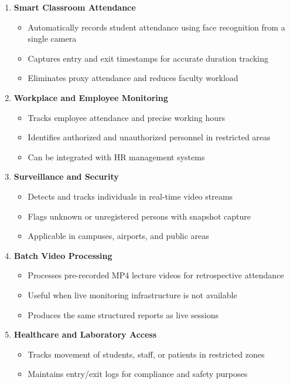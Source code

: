 \documentclass{report}
\begin{document}
\begin{enumerate}

\item \textbf{Smart Classroom Attendance}
\begin{itemize}
    \item Automatically records student attendance using face recognition from a single camera
    \item Captures entry and exit timestamps for accurate duration tracking
    \item Eliminates proxy attendance and reduces faculty workload
\end{itemize}

\item \textbf{Workplace and Employee Monitoring}
\begin{itemize}
    \item Tracks employee attendance and precise working hours
    \item Identifies authorized and unauthorized personnel in restricted areas
    \item Can be integrated with HR management systems
\end{itemize}

\item \textbf{Surveillance and Security}
\begin{itemize}
    \item Detects and tracks individuals in real-time video streams
    \item Flags unknown or unregistered persons with snapshot capture
    \item Applicable in campuses, airports, and public areas
\end{itemize}

\item \textbf{Batch Video Processing}
\begin{itemize}
    \item Processes pre-recorded MP4 lecture videos for retrospective attendance
    \item Useful when live monitoring infrastructure is not available
    \item Produces the same structured reports as live sessions
\end{itemize}

\item \textbf{Healthcare and Laboratory Access}
\begin{itemize}
    \item Tracks movement of students, staff, or patients in restricted zones
    \item Maintains entry/exit logs for compliance and safety purposes
\end{itemize}


\end{enumerate}
\end{document}
